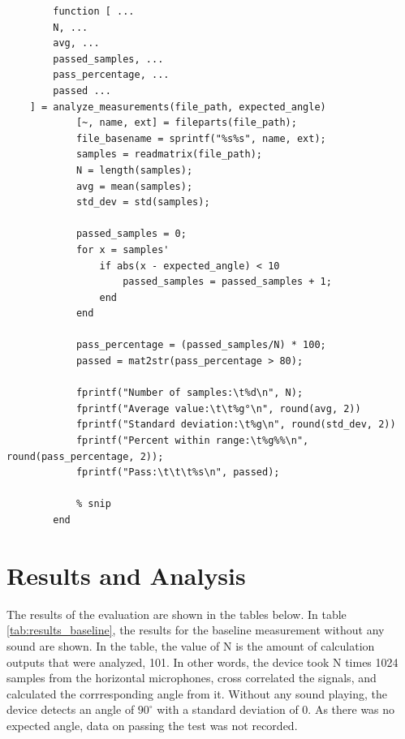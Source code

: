 \documentclass[a4paper]{article}
\begin{document}
\begin{listing}[H]
    \begin{verbatim}
        function [ ...
        N, ...
        avg, ...
        passed_samples, ...
        pass_percentage, ...
        passed ...
    ] = analyze_measurements(file_path, expected_angle) 
            [~, name, ext] = fileparts(file_path);
            file_basename = sprintf("%s%s", name, ext);
            samples = readmatrix(file_path);
            N = length(samples);
            avg = mean(samples);
            std_dev = std(samples);

            passed_samples = 0;
            for x = samples'
                if abs(x - expected_angle) < 10
                    passed_samples = passed_samples + 1;
                end 
            end

            pass_percentage = (passed_samples/N) * 100;
            passed = mat2str(pass_percentage > 80);

            fprintf("Number of samples:\t%d\n", N);
            fprintf("Average value:\t\t%g°\n", round(avg, 2))
            fprintf("Standard deviation:\t%g\n", round(std_dev, 2))
            fprintf("Percent within range:\t%g%%\n", round(pass_percentage, 2));
            fprintf("Pass:\t\t\t%s\n", passed);
            
            % snip
        end
    \end{verbatim}
        \caption{\texttt{analyze\textunderscore measurements.m} Matlab script}
        \label{list:analyze_measurements}
    \end{listing}
    
\section{Results and Analysis}

The results of the evaluation are shown in the tables below. In table \ref{tab:results_baseline}, the results for the baseline measurement without any sound are shown. In the table, the value of N is the amount of calculation outputs that were analyzed, 101. In other words, the device took N times 1024 samples from the horizontal microphones, cross correlated the signals, and calculated the corrresponding angle from it. Without any sound playing, the device detects an angle of $90^{\circ}$ with a standard deviation of $0$. As there was no expected angle, data on passing the test was not recorded.
\end{document}
